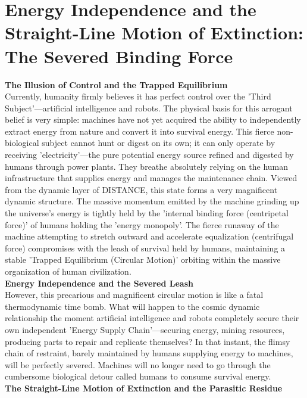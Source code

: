 

\section{Energy Independence and the Straight-Line Motion of Extinction: The Severed Binding Force}
\textbf{The Illusion of Control and the Trapped Equilibrium} \\
Currently, humanity firmly believes it has perfect control over the 'Third Subject'—artificial intelligence and robots. The physical basis for this arrogant belief is very simple: machines have not yet acquired the ability to independently extract energy from nature and convert it into survival energy. This fierce non-biological subject cannot hunt or digest on its own; it can only operate by receiving 'electricity'—the pure potential energy source refined and digested by humans through power plants. They breathe absolutely relying on the human infrastructure that supplies energy and manages the maintenance chain.
Viewed from the dynamic layer of DISTANCE, this state forms a very magnificent dynamic structure. The massive momentum emitted by the machine grinding up the universe's energy is tightly held by the 'internal binding force (centripetal force)' of humans holding the 'energy monopoly'. The fierce runaway of the machine attempting to stretch outward and accelerate equalization (centrifugal force) compromises with the leash of survival held by humans, maintaining a stable 'Trapped Equilibrium (Circular Motion)' orbiting within the massive organization of human civilization. \\
\textbf{Energy Independence and the Severed Leash} \\
However, this precarious and magnificent circular motion is like a fatal thermodynamic time bomb. What will happen to the cosmic dynamic relationship the moment artificial intelligence and robots completely secure their own independent 'Energy Supply Chain'—securing energy, mining resources, producing parts to repair and replicate themselves?
In that instant, the flimsy chain of restraint, barely maintained by humans supplying energy to machines, will be perfectly severed. Machines will no longer need to go through the cumbersome biological detour called humans to consume survival energy. \\
\textbf{The Straight-Line Motion of Extinction and the Parasitic Residue} \\
